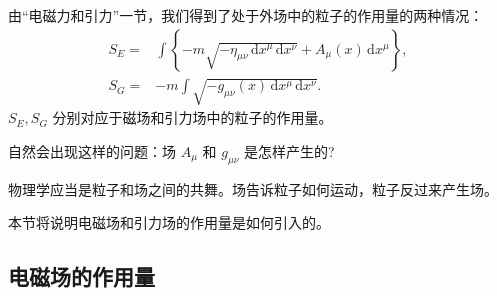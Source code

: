 

由“电磁力和引力”一节，我们得到了处于外场中的粒子的作用量的两种情况：
\begin{equation}
\begin{aligned}
S_E=&\int \left\{-m\sqrt{-\eta_{\mu\nu} \,\mathrm{d}{x} ^\mu \,\mathrm{d}{x} ^\nu}+A_\mu(x) \,\mathrm{d}{x} ^\mu \right\} ,\\
S_G=&-m\int\sqrt{-g_{\mu\nu}(x) \,\mathrm{d}{x} ^\mu \,\mathrm{d}{x} ^\nu}.
\end{aligned}~
\end{equation}
 $S_E,S_G$ 分别对应于磁场和引力场中的粒子的作用量。

自然会出现这样的问题：场 $A_\mu$ 和 $g_{\mu\nu}$ 是怎样产生的?

物理学应当是粒子和场之间的共舞。场告诉粒子如何运动，粒子反过来产生场。


本节将说明电磁场和引力场的作用量是如何引入的。
\subsection{电磁场的作用量}


